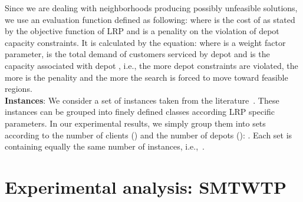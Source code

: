 \documentclass{acm_proc_article-sp}
\begin{document}
Since we are dealing with neighborhoods producing possibly unfeasible solutions, we use an evaluation function  defined as following:  where  is the cost of  as stated by the objective function of LRP and  is a penality on the violation of depot capacity constraints. It is calculated by the equation:  where  is a weight factor parameter,  is the total demand of customers serviced by depot  and  is the capacity associated with depot , i.e., the more depot constraints are violated, the more is the penality and the more the search is forced to move toward feasible regions.\\
\textbf{Instances}: We consider a set of  instances taken from the literature~\cite{ulrp}. These instances can be grouped into finely defined classes according LRP specific parameters. In our experimental results, we simply group them into  sets according to the number of clients () and the number of depots ():  . Each set is containing equally the same number of instances, i.e.,~.


\section{Experimental analysis: SMTWTP}\label{sec:smtwtp}
\end{document}
